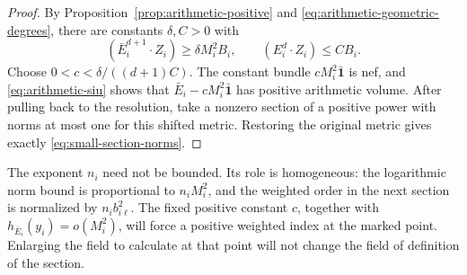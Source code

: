 \begin{proof}
By Proposition~\ref{prop:arithmetic-positive} and
\eqref{eq:arithmetic-geometric-degrees}, there are constants
\(\delta,C>0\) with
\[
 (\bar E_i^{d+1}\cdot Z_i)\ge\delta M_i^2B_i,
 \qquad (E_i^d\cdot Z_i)\le CB_i.
\]
Choose \(0<c<\delta/((d+1)C)\).  The constant bundle
\(cM_i^2\bar{\mathbf 1}\) is nef, and
\eqref{eq:arithmetic-siu} shows that
\(\bar E_i-cM_i^2\bar{\mathbf 1}\) has positive arithmetic volume.
After pulling back to the resolution, take a nonzero section of a
positive power with norms at most one for this shifted metric.  Restoring
the original metric gives exactly \eqref{eq:small-section-norms}.
\end{proof}

The exponent \(n_i\) need not be bounded.  Its role is homogeneous:
the logarithmic norm bound is proportional to \(n_iM_i^2\), and the
weighted order in the next section is normalized by \(n_i b_{i\ell}^2\).
The fixed positive constant \(c\), together with
\(h_{\bar E_i}(y_i)=o(M_i^2)\), will force a positive weighted index
at the marked point.  Enlarging the field to calculate at that point
will not change the field of definition of the section.
